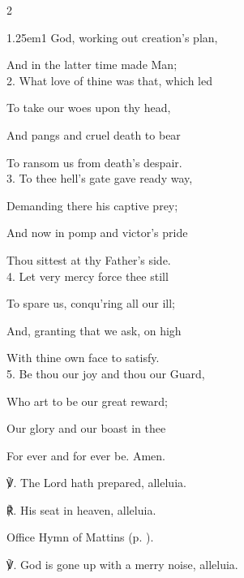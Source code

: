 \begin{paracol}{2}
\begin{hangparas}{1.25em}{1}
God, working out creation's plan,

And in the latter time made Man;\\

2. What love of thine was that, which led

To take our woes upon thy head,

And pangs and cruel death to bear

To ransom us from death's despair.\\

3. To thee hell's gate gave ready way,

Demanding there his captive prey;

And now in pomp and victor’s pride

Thou sittest at thy Father’s side.\\

4. Let very mercy force thee still

To spare us, conqu'ring all our ill;

And, granting that we ask, on high

With thine own face to satisfy.\\

5. Be thou our joy and thou our Guard,

Who art to be our great reward;

Our glory and our boast in thee

For ever and for ever be. Amen.\\
\end{hangparas}

℣. The Lord hath prepared, alleluia.

℟. His seat in heaven, alleluia.


\fussy
\end{paracol}

\secondEvensong


\begin{rubric}
	Office Hymn of Mattins (p. \pageref{AscensionMattinsHymn}). 
\end{rubric}

℣. God is gone up with a merry noise, alleluia.


